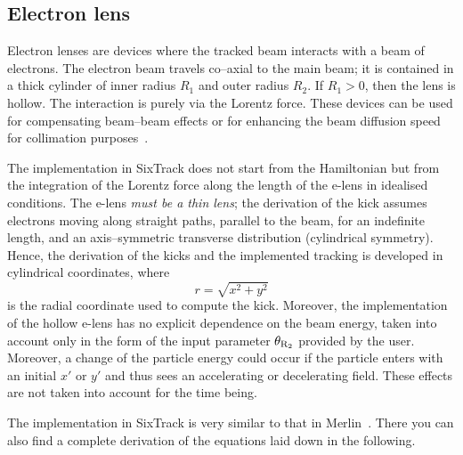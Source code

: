 \documentclass[english]{article}
\begin{document}
\subsection{Electron lens}
\label{elense}
Electron lenses are devices where the tracked beam interacts with a beam of electrons. The electron beam travels co--axial to the main beam; it
is contained in a thick cylinder of inner radius $R_1$ and outer radius $R_2$.
If $R_1>0$, then the lens is hollow. The interaction is purely via the Lorentz
force. These devices can be used for compensating beam--beam effects or for
enhancing the beam diffusion speed for collimation purposes~\cite{Shiltsev:2112966}.

The implementation in SixTrack does not start from the Hamiltonian but from the
integration of the Lorentz force along the length of the e-lens in idealised
conditions. The e-lens \emph{must be a thin lens};
the derivation of the kick assumes electrons moving along straight paths,
parallel to the beam, for an indefinite length, and an axis--symmetric
transverse distribution (cylindrical symmetry). Hence,
the derivation of the kicks and the implemented tracking is developed in cylindrical coordinates, where
\begin{equation}
  r=\sqrt{x^2+y^2}
\end{equation}
is the radial coordinate used to compute the kick. Moreover,
the implementation of the hollow e-lens has no explicit dependence on the
beam energy, taken into account only in the form of the input parameter
$\theta_{\rm R_2}$ provided by the user. Moreover, a change of the particle
energy could occur if the particle enters with an initial $x'$ or
$y'$ and thus sees an accelerating or decelerating field. These effects
are not taken into account for the time being.

The implementation in SixTrack is very similar to that in
Merlin~\cite{HReLens}. There you can also find a complete derivation of
the equations laid down in the following.
\end{document}
